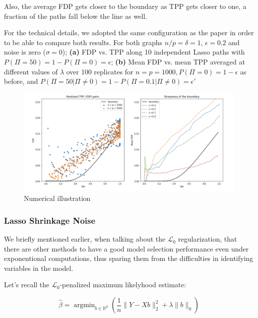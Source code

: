 \documentclass[10pt,onecolumn,letterpaper]{article}
\DeclareMathOperator*{\argmin}{argmin}
\begin{document}
Also, the average FDP gets closer to the boundary as TPP gets closer to one, a fraction of the paths fall below the line as well.
\newline

For the technical details, we adopted the same configuration as the paper in order to be able to compare both results. For both graphs $n/p = \delta = 1$, $\epsilon = 0.2$ and noise is zero ($\sigma = 0$);  \textbf{(a)} FDP vs. TPP along 10 independent Lasso paths with $P(\Pi = 50) = 1 - P(\Pi = 0) = \epsilon$;  \textbf{(b)} Mean FDP vs. mean TPP averaged at different values of $\lambda$ over 100 replicates for $n = p = 1000, P(\Pi = 0) = 1 - \epsilon$ as before, and $P(\Pi = 50| \Pi \neq 0) = 1 - P(\Pi = 0.1| \Pi \neq 0) = \epsilon \prime $


\begin{figure}[!htbp]
   \begin{center}
	\includegraphics[width=1.0\linewidth]{num_illustration}
   \caption{Numerical illustration}
   \label{fig:numillustration}
   \end{center}
\end{figure}


\subsubsection{Lasso Shrinkage Noise}

We briefly mentioned earlier, when talking about the $\mathcal{L}_0$ regularization, that there are other methods to have a good model selection performance even under exponentional computations, thus sparing them from the difficulties in identifying variables in the model.
\newline 

Let's recall the $\mathcal{L}_0$-penalized maximum likelyhood estimate:

$$
\hat{\beta} = \argmin_{b \in \mathbb{R}^p} \left( \frac{1}{n}\lVert Y - Xb \rVert_2^2 + \lambda \lVert b \rVert_0 \right )
$$
\end{document}
